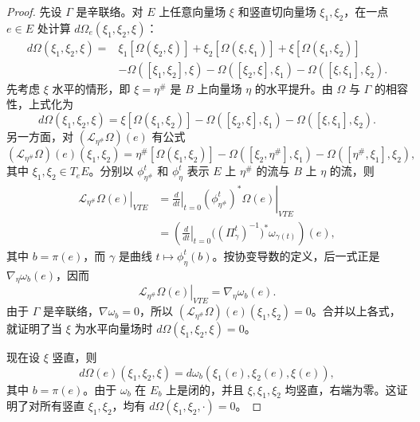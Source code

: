\begin{proof}
先设 $\Gamma$ 是辛联络。对 $E$ 上任意向量场 $\xi$ 和竖直切向量场
$\xi_1,\xi_2$，在一点 $e\in E$ 处计算 $d\Omega_e(\xi_1,\xi_2,\xi)$：
\[
\begin{aligned}
 d\Omega(\xi_1,\xi_2,\xi)
 ={}&\xi_1[\Omega(\xi_2,\xi)]
   +\xi_2[\Omega(\xi,\xi_1)]
   +\xi[\Omega(\xi_1,\xi_2)]\\
  &-\Omega([\xi_1,\xi_2],\xi)
   -\Omega([\xi_2,\xi],\xi_1)
   -\Omega([\xi,\xi_1],\xi_2).
\end{aligned}
\]
先考虑 $\xi$ 水平的情形，即 $\xi=\eta^\#$ 是 $B$ 上向量场 $\eta$ 的水平提升。由 $\Omega$ 与 $\Gamma$ 的相容性，上式化为
\begin{equation}
 d\Omega(\xi_1,\xi_2,\xi)
 =\xi[\Omega(\xi_1,\xi_2)]
  -\Omega([\xi_2,\xi],\xi_1)
  -\Omega([\xi,\xi_1],\xi_2).
 \label{eq:vertical-closedness-horizontal}
\end{equation}
另一方面，对 $(\mathcal L_{\eta^\#}\Omega)(e)$ 有公式
\begin{equation}
 (\mathcal L_{\eta^\#}\Omega)(e)(\xi_1,\xi_2)
 =\eta^\#[\Omega(\xi_1,\xi_2)]
  -\Omega([\xi_2,\eta^\#],\xi_1)
  -\Omega([\eta^\#,\xi_1],\xi_2),
 \label{eq:lie-derivative-compatible-form}
\end{equation}
其中 $\xi_1,\xi_2\in T_eE$。分别以 $\phi_{\eta^\#}^t$ 和
$\phi_\eta^t$ 表示 $E$ 上 $\eta^\#$ 的流与 $B$ 上 $\eta$ 的流，则
\[
\begin{aligned}
 \left.\mathcal L_{\eta^\#}\Omega(e)\right|_{VTE}
 &=\left.\frac d{dt}\right|_{t=0}
   \left.(\phi_{\eta^\#}^t)^*\Omega(e)\right|_{VTE}\\
 &=\left(
   \left.\frac d{dt}\right|_{t=0}
   \bigl((\Pi_\gamma^t)^{-1}\bigr)^*\omega_{\gamma(t)}
   \right)(e),
\end{aligned}
\]
其中 $b=\pi(e)$，而 $\gamma$ 是曲线 $t\mapsto\phi_\eta^t(b)$。按协变导数的定义，后一式正是 $\nabla_\eta\omega_b(e)$，因而
\begin{equation}
 \left.\mathcal L_{\eta^\#}\Omega(e)\right|_{VTE}
 =\nabla_\eta\omega_b(e).
 \label{eq:covariant-derivative-fiber-form}
\end{equation}
由于 $\Gamma$ 是辛联络，$\nabla\omega_b=0$，所以
$(\mathcal L_{\eta^\#}\Omega)(e)(\xi_1,\xi_2)=0$。合并以上各式，就证明了当 $\xi$ 为水平向量场时
$d\Omega(\xi_1,\xi_2,\xi)=0$。

现在设 $\xi$ 竖直，则
\[
 d\Omega(e)(\xi_1,\xi_2,\xi)
 =d\omega_b(\xi_1(e),\xi_2(e),\xi(e)),
\]
其中 $b=\pi(e)$。由于 $\omega_b$ 在 $E_b$ 上是闭的，并且
$\xi,\xi_1,\xi_2$ 均竖直，右端为零。这证明了对所有竖直
$\xi_1,\xi_2$，均有 $d\Omega(\xi_1,\xi_2,\mathord\cdot)=0$。


\end{proof}
